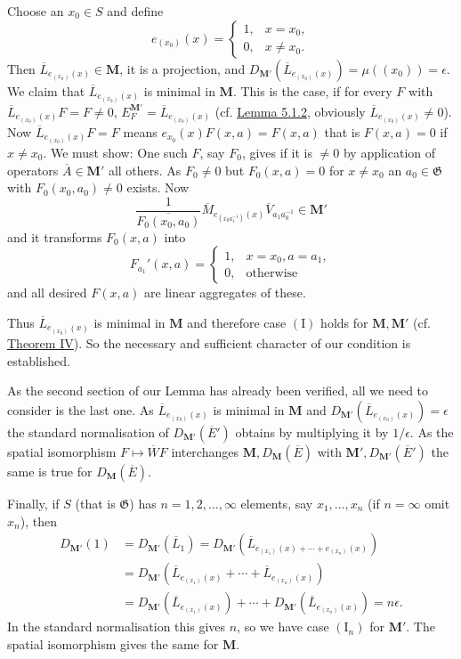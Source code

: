 \documentclass[12pt,b5paper,twoside]{article}
\newcommand{\M}{\mathbf M}
\newcommand{\lemref}[1]{\hyperref[lem:#1]{Lemma #1}}
\newcommand{\thmref}[1]{\hyperref[thm:#1]{Theorem #1}}
\begin{document}
Choose an $x_0\in S$ and define
\[
 e_{(x_0)}(x)=\begin{cases}
  1,&x=x_0,\\
  0,&x\neq x_0.
 \end{cases}
\]
Then $\overline L_{e_{(x_0)}(x)}\in\M$, it is a projection, and
$D_{\M'}(\overline L_{e_{(x_0)}(x)})=\mu((x_0))=\epsilon$. We claim that
$\overline L_{e_{(x_0)}(x)}$ is minimal in $\M$. This is the case, if for every
$F$ with $\overline L_{e_{(x_0)}(x)}F=F\neq0$,
$E_F^{\M'}=\overline L_{e_{(x_0)}(x)}$ (cf. \lemref{5.1.2}, obviously
$\overline L_{e_{(x_0)}(x)}\neq0$). Now
$\overline L_{e_{(x_0)}(x)}F=F$ means
$e_{x_0}(x)F(x,a)=F(x,a)$ that is $F(x,a)=0$ if $x\neq x_0$. We must show:
One such $F$, say $F_0$, gives if it is $\neq0$ by application of operators
$\overline A\in\M'$ all others. As $F_0\neq0$ but $F_0(x,a)=0$ for
$x\neq x_0$ an $a_0\in\mathfrak G$ with $F_0(x_0,a_0)\neq0$ exists. Now
\[
 \frac1{\overline{F_0(x_0,a_0)}}
 \overline M_{e_{(x_0a_1^{-1})}(x)}\overline V_{a_1a_0^{-1}}\in\M'
\]
and it transforms $F_0(x,a)$ into
\[
 F_{a_1}'(x,a)=\begin{cases}
  1,&x=x_0, a=a_1,\\
  0,&\text{otherwise}
 \end{cases}
\]
and all desired $F(x,a)$ are linear aggregates of these.

Thus $\overline L_{e_{(x_0)}(x)}$ is minimal in $\M$ and therefore case
$(\mathrm I)$ holds for $\M,\M'$ (cf. \thmref{IV}). So the necessary and
sufficient character of our condition is established.

As the second section of our Lemma has already been verified, all we need to
consider is the last one. As $\overline L_{e_{(x_0)}(x)}$ is minimal in $\M$
and $D_{\M'}(\overline L_{e_{(x_0)}(x)})=\epsilon$ the standard
normalisation of $D_{\M'}(\overline E')$ obtains by multiplying it by
$1/\epsilon$. As the spatial isomorphism $F\mapsto\overline WF$ interchanges
$\M,D_\M(\overline E)$ with $\M',D_{\M'}(\overline E')$ the same is true for
$D_\M(\overline E)$.

Finally, if $S$ (that is $\mathfrak G$) has $n=1,2,\ldots,\infty$ elements,
say $x_1,\ldots,x_n$ (if $n=\infty$ omit $x_n$), then
\begin{align*}
 D_{\M'}(1)&=D_{\M'}(\overline L_1)
 =D_{\M'}(\overline L_{e_{(x_1)}(x)+\cdots+e_{(x_n)}(x)})\\
 &=D_{\M'}(\overline L_{e_{(x_1)}(x)}+\cdots+
              \overline L_{e_{(x_n)}(x)})\\
 &=D_{\M'}(\overline L_{e_{(x_1)}(x)})+\cdots+
   D_{\M'}(\overline L_{e_{(x_n)}(x)})=n\epsilon.
\end{align*}
In the standard normalisation this gives $n$, so we have case
$(\mathrm I_n)$ for $\M'$. The spatial isomorphism gives the same for $\M$.
\end{document}
